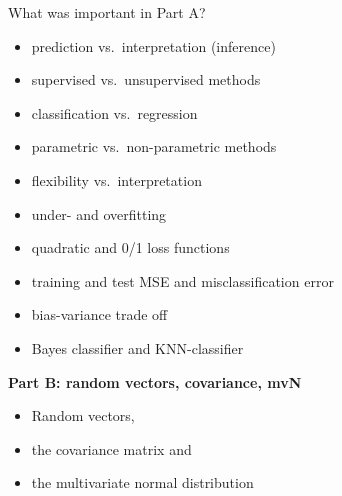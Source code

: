 \documentclass[ignorenonframetext,]{beamer}
\providecommand{\tightlist}{%
  \setlength{\itemsep}{0pt}\setlength{\parskip}{0pt}}
\begin{document}
\begin{frame}

\begin{block}{What was important in Part A?}

\begin{itemize}
\tightlist
\item
  prediction vs.~interpretation (inference)
\item
  supervised vs.~unsupervised methods
\item
  classification vs.~regression
\item
  parametric vs.~non-parametric methods
\item
  flexibility vs.~interpretation
\item
  under- and overfitting
\item
  quadratic and 0/1 loss functions
\item
  training and test MSE and misclassification error
\item
  bias-variance trade off
\item
  Bayes classifier and KNN-classifier
\end{itemize}

\end{block}

\end{frame}

\begin{frame}

\large

\textbf{Part B: random vectors, covariance, mvN}

\normalsize

\begin{itemize}
\tightlist
\item
  Random vectors,
\item
  the covariance matrix and
\item
  the multivariate normal distribution
\end{itemize}

\end{frame}
\end{document}
